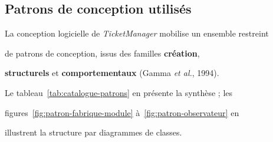 







\subsection{Patrons de conception utilisés}



La conception logicielle de \textit{TicketManager} mobilise un ensemble restreint

de patrons de conception, issus des familles \textbf{création},

\textbf{structurels} et \textbf{comportementaux} (Gamma \textit{et al.}, 1994).

Le tableau~\ref{tab:catalogue-patrons} en présente la synthèse ; les

figures~\ref{fig:patron-fabrique-module} à~\ref{fig:patron-observateur} en

illustrent la structure par diagrammes de classes.



